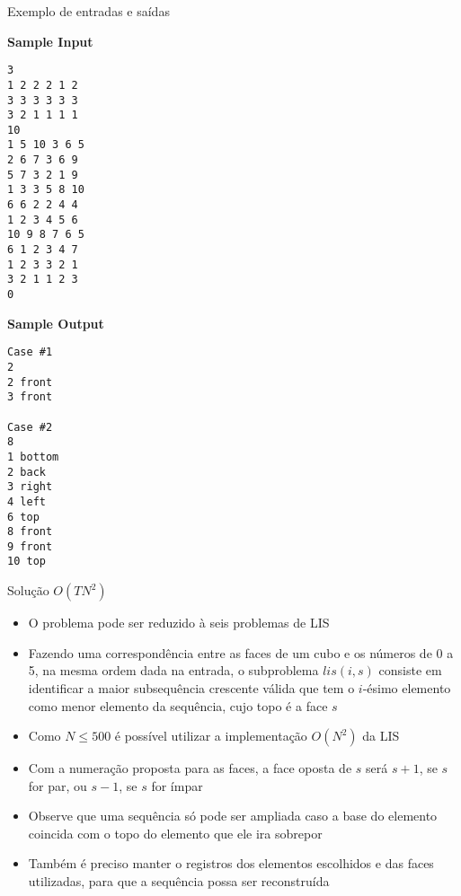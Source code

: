 \begin{frame}[fragile]{Exemplo de entradas e saídas}

\begin{small}
\begin{minipage}[t]{0.55\textwidth}
\textbf{Sample Input}
\begin{verbatim}
3
1 2 2 2 1 2
3 3 3 3 3 3
3 2 1 1 1 1
10
1 5 10 3 6 5
2 6 7 3 6 9
5 7 3 2 1 9
1 3 3 5 8 10
6 6 2 2 4 4
1 2 3 4 5 6
10 9 8 7 6 5
6 1 2 3 4 7
1 2 3 3 2 1
3 2 1 1 2 3
0
\end{verbatim}
\end{minipage}
\begin{minipage}[t]{0.4\textwidth}
\textbf{Sample Output}
\begin{verbatim}
Case #1
2
2 front
3 front

Case #2
8
1 bottom
2 back
3 right
4 left
6 top
8 front
9 front
10 top
\end{verbatim}
\end{minipage}
\end{small}

\end{frame}

\begin{frame}[fragile]{Solução $O(TN^2)$}

   \begin{itemize}
        \item O problema pode ser reduzido à seis problemas de LIS

        \item Fazendo uma correspondência entre as faces de um cubo e os números de 0 a 5,
            na mesma ordem dada na entrada, o subproblema $lis(i, s)$ consiste em identificar
            a maior subsequência crescente válida que tem o $i$-ésimo elemento como menor
            elemento da sequência, cujo topo é a face $s$

        \item Como $N\leq 500$ é possível utilizar a implementação $O(N^2)$ da LIS

        \item Com a numeração proposta para as faces, a face oposta de $s$ será $s + 1$, se
            $s$ for par, ou $s - 1$, se $s$ for ímpar

        \item Observe que uma sequência só pode ser ampliada caso a base do elemento
            coincida com o topo do elemento que ele ira sobrepor

        \item Também é preciso manter o registros dos elementos escolhidos e das faces 
            utilizadas, para que a sequência possa ser reconstruída
   \end{itemize}

\end{frame}

